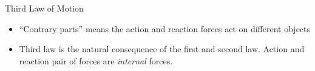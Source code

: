 \documentclass[12pt,compress,aspectratio=169]{beamer}
\begin{document}
\begin{frame}{Third Law of Motion}
  \begin{center}
  \end{center}

  \begin{itemize}
  \item ``Contrary parts'' means the action and reaction forces act on
    different objects
  \item Third law is the natural consequence of the first and second law.
    Action and reaction pair of forces are \emph{internal} forces.
  \end{itemize}
  \vspace{.2in}
\end{frame}


%  
\end{document}
